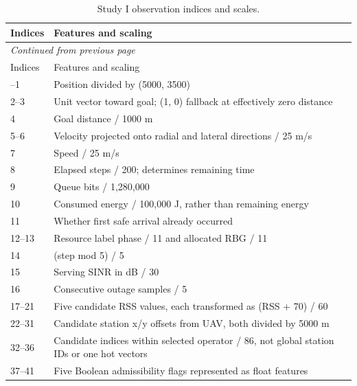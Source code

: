 {\footnotesize\setlength{\tabcolsep}{3pt}
\begin{longtable}{@{}p{}p{}@{}}
\caption{Study I observation indices and scales.}\label{tab:obs1}\\
\toprule Indices & Features and scaling\\\midrule
\endfirsthead
\multicolumn{2}{l}{\textit{Continued from previous page}}\\\toprule
Indices & Features and scaling\\\midrule
\endhead
\bottomrule\endfoot
0--1 & Position divided by (5000, 3500)\\
2--3 & Unit vector toward goal; (1, 0) fallback at effectively zero distance\\
4 & Goal distance / 1000 m\\
5--6 & Velocity projected onto radial and lateral directions / 25 m/s\\
7 & Speed / 25 m/s\\
8 & Elapsed steps / 200; determines remaining time\\
9 & Queue bits / 1,280,000\\
10 & Consumed energy / 100,000 J, rather than remaining energy\\
11 & Whether first safe arrival already occurred\\
12--13 & Resource label phase / 11 and allocated RBG / 11\\
14 & (step mod 5) / 5\\
15 & Serving SINR in dB / 30\\
16 & Consecutive outage samples / 5\\
17--21 & Five candidate RSS values, each transformed as (RSS + 70) / 60\\
22--31 & Candidate station x/y offsets from UAV, both divided by 5000 m\\
32--36 & Candidate indices within selected operator / 86, not global station IDs or one hot vectors\\
37--41 & Five Boolean admissibility flags represented as float features\\
\end{longtable}}

